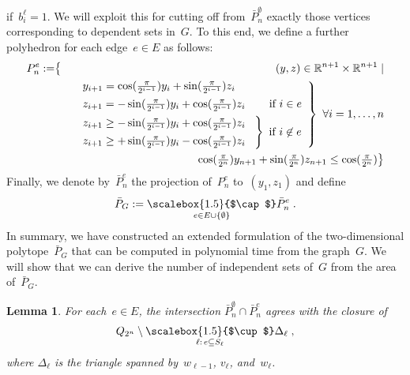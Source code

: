 \documentclass{article}
\newtheorem{lemma}[theorem]{Lemma}
\newcommand{\R}{\mathbb{R}}
\newcommand{\medcup}{\scalebox{1.5}{$\cup$}}
\newcommand{\medcap}{\scalebox{1.5}{$\cap$}}
\begin{document}
if~$b^\ell_i=1$. We will exploit this for cutting off from~$\bar
P_n^\emptyset$ exactly those vertices corresponding to dependent sets
in~$G$. To this end, we define a further polyhedron for each
edge~$e\in E$ as follows:
\begin{eqnarray*}
  P^e_n:= & \big\{ & (y,z)\in\R^{n+1}\times\R^{n+1}\mid\\
  && \left.\begin{array}{l}
    \,\,y_{i+1} = \cos(\tfrac\pi{2^{i-1}})y_{i}+\sin(\tfrac\pi{2^{i-1}})z_{i}\\[1ex]
    \,\,z_{i+1} = -\sin(\tfrac\pi{2^{i-1}})y_{i}+\cos(\tfrac\pi{2^{i-1}})z_{i} \hspace*{4.25ex} \text{ if~$i\in e$}\\[1ex]
    \hspace*{-0.66ex}\left.\begin{array}{l}
    z_{i+1} \ge -\sin(\tfrac\pi{2^{i-1}})y_{i}+\cos(\tfrac\pi{2^{i-1}})z_{i}\\[1ex]
    z_{i+1} \ge +\sin(\tfrac\pi{2^{i-1}})y_{i}-\cos(\tfrac\pi{2^{i-1}})z_{i}
    \end{array}
    ~ \right\} \text{ if~$i\not\in e$}
  \end{array}\right\} ~ \forall i=1,\dots,n\\
  &&\;\;\;\, \cos(\tfrac\pi{2^n})y_{n+1}+\sin(\tfrac\pi{2^n})z_{n+1}\le \cos(\tfrac\pi{2^n})
  \big\}
\end{eqnarray*}
Finally, we denote by~$\bar P^e_n$ the projection of~$P^e_n$
to~$(y_1,z_1)$ and define
\[
\bar P_G:=\underset{e\in E\cup\{\emptyset\}}{\medcap}\bar P^e_n\;.
\]
In summary, we have constructed an extended formulation of the
two-dimensional polytope~$\bar P_G$ that can be computed in polynomial
time from the graph~$G$. We will show that we can derive the number of
independent sets of~$G$ from the area of~$\bar P_G$.
\begin{lemma}\label{lem:main}
  For each~$e\in E$, the intersection $\bar
  P^\emptyset_n\cap\bar P^e_n$ agrees with the closure of
  \[
  Q_{2^n}\setminus\underset{\ell:\,e\subseteq
    S_\ell}{\medcup}\Delta_\ell\;,
  \]
  where $\Delta_\ell$ is the triangle spanned by~$w_{\ell-1}$,
  $v_\ell$, and~$w_{\ell}$.
\end{lemma}
\end{document}
